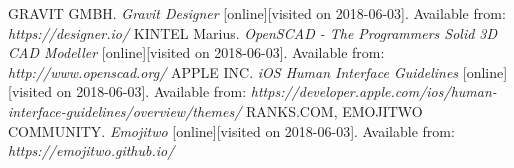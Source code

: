 \documentclass{article}
\begin{document}
\newpage

\begin{thebibliography}{}
GRAVIT GMBH. \textit{Gravit Designer} [online][visited on 2018-06-03]. Available from: \textit{https://designer.io/}
KINTEL Marius. \textit{OpenSCAD - The Programmers Solid 3D CAD Modeller} [online][visited on 2018-06-03]. Available from: \textit{http://www.openscad.org/}
APPLE INC. \textit{iOS Human Interface Guidelines} [online][visited on 2018-06-03]. Available from: \textit{https://developer.apple.com/ios/human-interface-guidelines/overview/themes/}
RANKS.COM, EMOJITWO COMMUNITY. \textit{Emojitwo} [online][visited on 2018-06-03]. Available from: \textit{https://emojitwo.github.io/}
\end{thebibliography}
\end{document}
